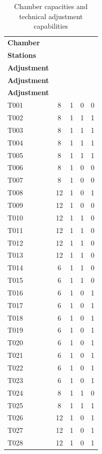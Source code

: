 \documentclass[11pt]{article}
\begin{document}
\begin{table}[H]
\centering
\caption{Chamber capacities and technical adjustment capabilities}
\label{tab:chamber_capabilities_short}
\footnotesize
\setlength{\tabcolsep}{4pt}
\renewcommand{\arraystretch}{1.1}
\begin{tabular}{lcccc}
\hline
\textbf{Chamber} &
\shortstack{\textbf{No. of}\\\textbf{Stations}} &
\shortstack{\textbf{Temperature}\\\textbf{Adjustment}} &
\shortstack{\textbf{Humidity}\\\textbf{Adjustment}} &
\shortstack{\textbf{Voltage}\\\textbf{Adjustment}} \\
\hline
T001 & 8  & 1 & 0 & 0 \\
T002 & 8  & 1 & 1 & 1 \\
T003 & 8  & 1 & 1 & 1 \\
T004 & 8  & 1 & 1 & 1 \\
T005 & 8  & 1 & 1 & 1 \\
T006 & 8  & 1 & 0 & 0 \\
T007 & 8  & 1 & 0 & 0 \\
T008 & 12 & 1 & 0 & 1 \\
T009 & 12 & 1 & 0 & 0 \\
T010 & 12 & 1 & 1 & 0 \\
T011 & 12 & 1 & 1 & 0 \\
T012 & 12 & 1 & 1 & 0 \\
T013 & 12 & 1 & 1 & 0 \\
T014 & 6  & 1 & 1 & 0 \\
T015 & 6  & 1 & 1 & 0 \\
T016 & 6  & 1 & 0 & 1 \\
T017 & 6  & 1 & 0 & 1 \\
T018 & 6  & 1 & 0 & 1 \\
T019 & 6  & 1 & 0 & 1 \\
T020 & 6  & 1 & 0 & 1 \\
T021 & 6  & 1 & 0 & 1 \\
T022 & 6  & 1 & 0 & 1 \\
T023 & 6  & 1 & 0 & 1 \\
T024 & 8  & 1 & 1 & 0 \\
T025 & 8  & 1 & 1 & 1 \\
T026 & 12 & 1 & 0 & 1 \\
T027 & 12 & 1 & 0 & 1 \\
T028 & 12 & 1 & 0 & 1 \\
\hline
\end{tabular}
\end{table}
\end{document}
